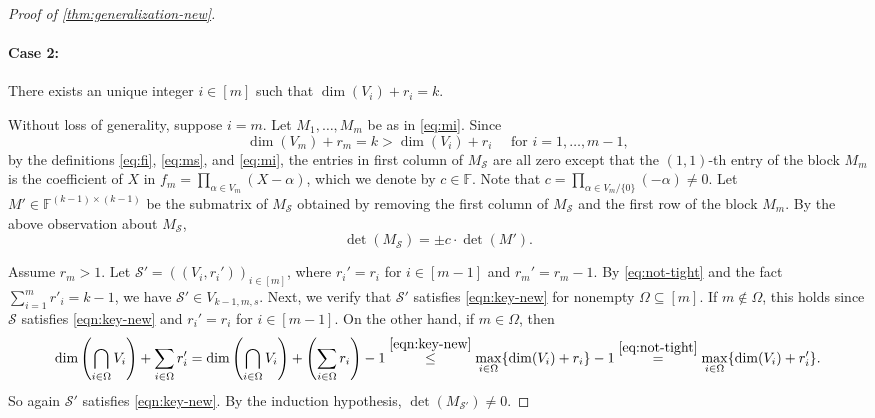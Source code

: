 \documentclass[11pt]{article}
\theoremstyle{plain}
\theoremstyle{definition}
\theoremstyle{remark}
\newcommand{\F}{\mathbb{F}}
\newcommand{\cS}{\mathcal{S}}
\begin{document}
\begin{proof}[Proof of \cref{thm:generalization-new}]
\paragraph{Case 2:} 
There exists an unique integer $i\in [m]$ such that $\dim(V_i)+r_i=k$. 

Without loss of generality, suppose $i=m$. 
Let $M_1,\dots,M_m$ be as in \eqref{eq:mi}.
Since 
\begin{equation}\label{eq:not-tight}
\dim(V_m)+r_m=k>\dim(V_i)+r_i \quad\text{ for } i=1,\dots,m-1,
\end{equation}
by the definitions \eqref{eq:fi}, \eqref{eq:ms}, and \eqref{eq:mi}, the entries in first column of $M_{\cS}$ are all zero except that the $(1,1)$-th entry of the block $M_m$ is the coefficient of $X$ in $f_m=\prod_{\alpha\in V_m} (X-\alpha)$, which we denote by $c\in\F$. Note that $c=\prod_{\alpha\in V_m/\{0\}}(-\alpha)\neq 0$. Let $M'\in\F^{(k-1)\times (k-1)}$ be the submatrix of $M_{\cS}$ obtained by removing the first column of $M_{\cS}$ and the first row of the block $M_m$.
By the above observation about $M_{\cS}$,
\begin{equation}\label{eq:submatrix}
\det(M_{\cS})=\pm c\cdot \det(M').
\end{equation}

Assume $r_m>1$. Let $\cS'=((V_i, r_i'))_{i\in [m]}$, where $r_i'=r_i$ for $i\in [m-1]$ and $r_m'=r_m-1$.
By \eqref{eq:not-tight} and the fact $\sum_{i=1}^m r'_i=k-1$, we have $\cS'\in V_{k-1,m,s}$. Next, we verify that  $\cS'$ satisfies \eqref{eqn:key-new} for nonempty $\Omega\subseteq [m]$. If $m\not\in\Omega$, this holds since $\cS$ satisfies \eqref{eqn:key-new} and $r_i'=r_i$ for $i\in [m-1]$. On the other hand, if $m\in\Omega$, then
\[
\dim\left(\bigcap_{i\in \Omega} V_i\right)+\sum_{i\in \Omega}r'_i=\dim\left(\bigcap_{i\in \Omega} V_i\right)+\left(\sum_{i\in \Omega}r_i\right)-1\stackrel{\eqref{eqn:key-new}}{\leq} \max_{i\in \Omega}\{\dim(V_i)+r_i\}-1
\stackrel{\eqref{eq:not-tight}}{=}\max_{i\in \Omega}\{\dim(V_i)+r'_i\}.
\]
So again $\cS'$ satisfies \eqref{eqn:key-new}.
By the induction hypothesis, $\det(M_{\cS'})\neq 0$.


\end{proof}
\end{document}
